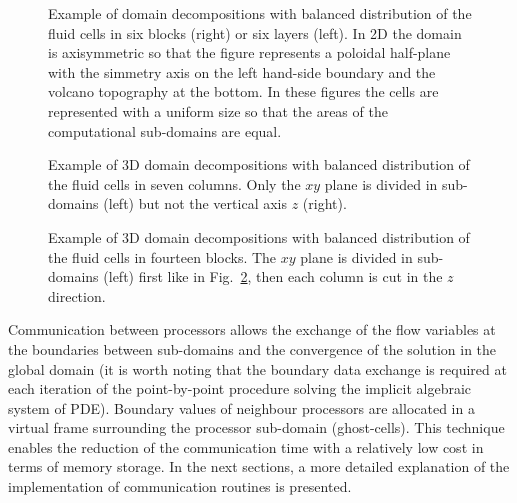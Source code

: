 %
\begin{figure}[htb]
\setlength{\unitlength}{1mm}
\begin{center}
\begin{minipage}{6cm}
\centerline{}
\end{minipage}
\end{center}
\caption{Example of domain decompositions with balanced distribution of
the fluid cells in six blocks (right) or six layers (left).
In 2D the domain is axisymmetric so that the figure represents a poloidal
half-plane with the simmetry axis on the left hand-side boundary and
the volcano topography at the bottom. In these figures the cells are represented
with a uniform size so that the areas of the computational sub-domains
are equal.\label{fig:Ves_part_lay}}
\end{figure}
%
\begin{figure}[htb]
\setlength{\unitlength}{1mm}
\begin{center}
\begin{minipage}{6cm}
\centerline{}
\end{minipage}
\end{center}
\caption{Example of 3D domain decompositions with balanced distribution of
the fluid cells in seven columns. Only the $xy$ plane is divided in sub-domains (left) 
but not the vertical axis $z$ (right). \label{fig:Ves_part_col}}
\end{figure}
%
\begin{figure}[htb]
\setlength{\unitlength}{1mm}
\begin{center}
\begin{minipage}{6cm}
\centerline{}
\end{minipage}
\end{center}
\caption{Example of 3D domain decompositions with balanced distribution of
the fluid cells in fourteen blocks. The $xy$ plane is divided in sub-domains (left)
first like in Fig.~\ref{fig:Ves_part_col}, then each column is cut in 
the $z$ direction.\label{fig:Ves_part_blk}}
\end{figure}

Communication between processors allows the exchange of the flow variables
at the boundaries between sub-domains and the convergence of the solution
in the global domain (it is worth noting that the
boundary data exchange is required at each iteration of the point-by-point
procedure solving the implicit algebraic system of PDE).
Boundary values of neighbour processors are allocated in a virtual
frame surrounding the processor sub-domain (ghost-cells). This technique
enables the reduction of the communication time with a relatively low cost
in terms of memory storage.
In the next sections, a more detailed explanation of the implementation of communication
routines is presented.
%
